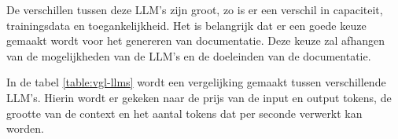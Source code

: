 De verschillen tussen deze LLM's zijn groot, zo is er een verschil in capaciteit, trainingsdata en toegankelijkheid.
Het is belangrijk dat er een goede keuze gemaakt wordt voor het genereren van documentatie.
Deze keuze zal afhangen van de mogelijkheden van de LLM's en de doeleinden van de documentatie.

\begin{table}[h!]
\centering
{}
\caption{Vergelijking van verschillende LLM's op basis van prijs (\$), context (aantal tokens) en snelheid (Tokens per seconde) \autocite{ArtificialAnalysis2024}}
\label{table:vgl-llms}
\end{table}

In de tabel \ref{table:vgl-llms} wordt een vergelijking gemaakt tussen verschillende LLM's.
Hierin wordt er gekeken naar de prijs van de input en output tokens, de grootte van de context en het aantal tokens dat per seconde verwerkt kan worden.

